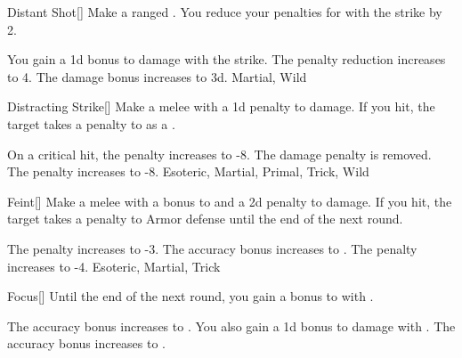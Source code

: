 \lowercase{\hypertarget{maneuver:Distant Shot}{}}\label{maneuver:Distant Shot}
\hypertarget{maneuver:Distant Shot}{}
\begin{freeability}{Distant Shot}[]
Make a ranged .
You reduce your penalties for  with the strike by 2.

\rankline
{} You gain a \plus1d bonus to damage with the strike.
 The penalty reduction increases to 4.
 The damage bonus increases to \plus3d.
 Martial, Wild
\end{freeability}
\vspace{0.25em}



\lowercase{\hypertarget{maneuver:Distracting Strike}{}}\label{maneuver:Distracting Strike}
\hypertarget{maneuver:Distracting Strike}{}
\begin{freeability}{Distracting Strike}[]
Make a melee  with a \minus1d penalty to damage.
If you hit, the target takes a  penalty to  as a .

\rankline
{} On a critical hit, the penalty increases to -8.
 The damage penalty is removed.
 The penalty increases to -8.
 Esoteric, Martial, Primal, Trick, Wild
\end{freeability}
\vspace{0.25em}



\lowercase{\hypertarget{maneuver:Feint}{}}\label{maneuver:Feint}
\hypertarget{maneuver:Feint}{}
\begin{freeability}{Feint}[]
Make a melee  with a  bonus to  and a \minus2d penalty to damage.
If you hit, the target takes a  penalty to Armor defense until the end of the next round.

\rankline
{} The penalty increases to -3.
 The accuracy bonus increases to .
 The penalty increases to -4.
 Esoteric, Martial, Trick
\end{freeability}
\vspace{0.25em}



\lowercase{\hypertarget{maneuver:Focus}{}}\label{maneuver:Focus}
\hypertarget{maneuver:Focus}{}
\begin{freeability}{Focus}[]
Until the end of the next round, you gain a  bonus to  with .

\rankline
{} The accuracy bonus increases to .
 You also gain a \plus1d bonus to damage with .
 The accuracy bonus increases to .
\end{freeability}
\vspace{0.25em}



